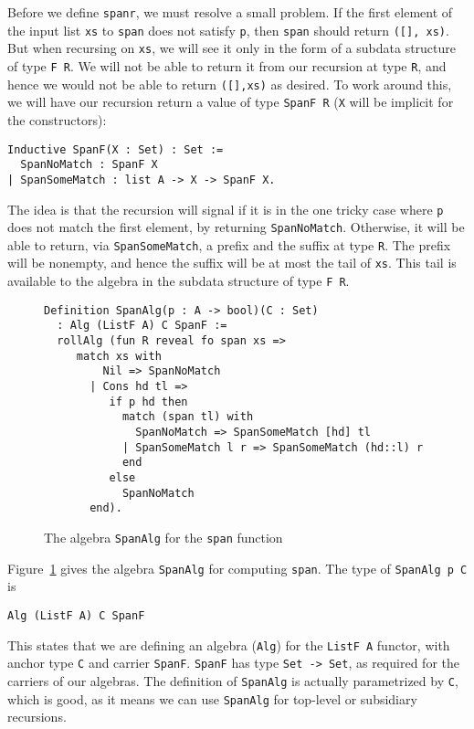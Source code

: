 \documentclass[a4paper,USenglish]{lipics-v2021}
\begin{document}
Before we define \verb|spanr|, we must resolve a small problem.
If the first element of the input list
\verb|xs| to \verb|span| does not satisfy \verb|p|, then \verb|span|
should return \verb|([], xs)|.  But when recursing on \verb|xs|, we
will see it only in the form of a subdata structure of type
\verb|F R|.  We will not be able to return it from our recursion at
type \verb|R|, and hence we would not be able to return \verb|([],xs)|
as desired.  To work around this, we will have our recursion return a value
of type \verb|SpanF R| (\verb|X| will be implicit for the constructors):
\begin{verbatim}
Inductive SpanF(X : Set) : Set :=
  SpanNoMatch : SpanF X
| SpanSomeMatch : list A -> X -> SpanF X.
\end{verbatim}
\noindent The idea is that the recursion will signal if it is in the
one tricky case where \verb|p| does not match the first element, by
returning \verb|SpanNoMatch|.  Otherwise, it will be able to return,
via \verb|SpanSomeMatch|, a prefix and the suffix at type
\verb|R|. The prefix will be nonempty, and hence the suffix will be at
most the tail of \verb|xs|.  This tail is available to the algebra
in the subdata structure of type \verb|F R|.

\begin{figure}
\begin{verbatim}
Definition SpanAlg(p : A -> bool)(C : Set)
  : Alg (ListF A) C SpanF :=
  rollAlg (fun R reveal fo span xs => 
     match xs with
         Nil => SpanNoMatch 
       | Cons hd tl =>
          if p hd then
            match (span tl) with
              SpanNoMatch => SpanSomeMatch [hd] tl
            | SpanSomeMatch l r => SpanSomeMatch (hd::l) r
            end
          else
            SpanNoMatch 
       end).
\end{verbatim}
\caption{The algebra \texttt{SpanAlg} for the \texttt{span} function}
\label{fig:spanalg}
\end{figure}

Figure~\ref{fig:spanalg} gives the algebra \verb|SpanAlg| for computing
\verb|span|.  The type of \verb|SpanAlg p C| is
\begin{verbatim}
Alg (ListF A) C SpanF
\end{verbatim}
This states that we are defining an algebra (\verb|Alg|) for the
\verb|ListF A| functor, with anchor type \verb|C| and carrier
\verb|SpanF|.  \verb|SpanF| has type \verb|Set -> Set|, as required
for the carriers of our algebras. The definition of \verb|SpanAlg| is
actually parametrized by \verb|C|, which is good, as it means we can
use \verb|SpanAlg| for top-level or subsidiary recursions.
\end{document}
